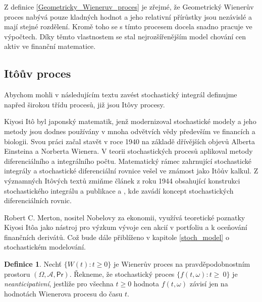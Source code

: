 \documentclass[a4paper,12pt]{report}
\theoremstyle{definition} \newtheorem{definice}[veta]{Definice}
\theoremstyle{remark}
\begin{document}
Z definice \ref{Geometricky_Wieneruv_proces} je zřejmé, že Geometrický Wienerův proces nabývá pouze kladných hodnot a jeho relativní přírůstky jsou nezávislé a mají stejné rozdělení. 
Kromě toho se s tímto procesem docela snadno pracuje ve výpočtech. 
Díky těmto vlastnostem se stal nejrozšířenějším model chování cen aktiv ve finanční matematice.

\subsection{It\^oův proces}
Abychom mohli v následujícím textu zavést stochastický integrál definujme napřed širokou třídu procesů, již jsou It\^ovy procesy.

Kiyosi It\^o byl japonský matematik, jenž modernizoval stochastické modely a jeho metody jsou dodnes používány v mnoha odvětvích vědy především ve financích a biologii.
Svou práci začal stavět v roce 1940 na základě dřívějších objevů Alberta Einsteina a Norberta Wienera.
V teorii stochastických procesů aplikoval metody diferenciálního a integrálního počtu.
Matematický rámec zahrnující stochastické integrály a stochastické diferenciální rovnice vešel ve známost jako It\^oův kalkul.
Z významných It\^ových textů zmiňme 
článek \cite{ito1944} z roku 1944 obsahující konstrukci stochastického integrálu
a publikace \cite{ito1946} a
\cite{ito1951stochastic}, kde zavádí koncept stochastických diferenciálních rovnic.

Robert C. Merton, nositel Nobelovy za ekonomii, využívá teoretické poznatky Kiyosi It\^oa jako nástroj pro výzkum vývoje cen akcií v portfoliu a k oceňování finančních derivátů.
Což bude dále přiblíženo v kapitole \ref{stoch_model} o stochastickém modelování.

\begin{definice}
Nechť $\{W(t):t\ge0\}$ je Wienerův proces na pravděpodobnostním prostoru $(\Omega,\mathcal{A},\mathsf{Pr})$.
Řekneme, že stochastický proces $\{f(t,\omega):t\ge~0\}$ je \textit{neanticipativní}, jestliže pro všechna $t\ge0$ hodnota $f(t,\omega)$ závisí jen na hodnotách Wienerova procesu do času $t$.
\end{definice}
\end{document}
